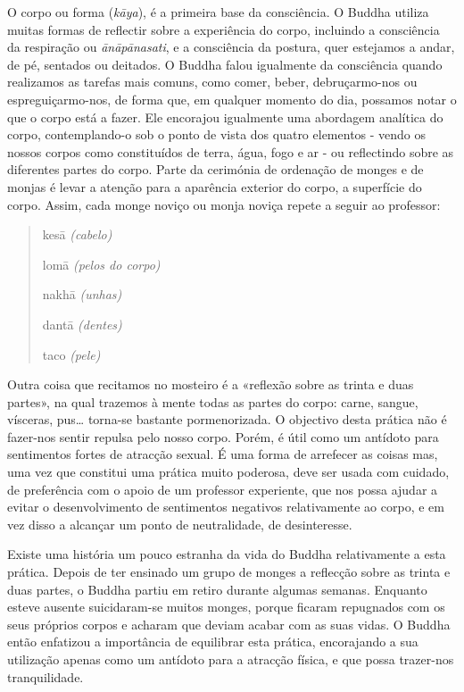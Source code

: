 O corpo ou forma (\emph{kāya}), é a primeira base da consciência. O
Buddha utiliza muitas formas de reflectir sobre a experiência do corpo,
incluindo a consciência da respiração ou \emph{ānāpānasati}, e a
consciência da postura, quer estejamos a andar, de pé, sentados ou
deitados. O Buddha falou igualmente da consciência quando realizamos as
tarefas mais comuns, como comer, beber, debruçarmo-nos ou
espreguiçarmo-nos, de forma que, em qualquer momento do dia, possamos
notar o que o corpo está a fazer. Ele encorajou igualmente uma abordagem
analítica do corpo, contemplando-o sob o ponto de vista dos quatro
elementos - vendo os nossos corpos como constituídos de terra, água,
fogo e ar - ou reflectindo sobre as diferentes partes do corpo. Parte da
cerimónia de ordenação de monges e de monjas é levar a atenção para a
aparência exterior do corpo, a superfície do corpo. Assim, cada monge
noviço ou monja noviça repete a seguir ao professor:

\begin{quote}
  kesā \emph{(cabelo)}

  lomā \emph{(pelos do corpo)}

  nakhā \emph{(unhas)}

  dantā \emph{(dentes)}

  taco \emph{(pele)}
\end{quote}

Outra coisa que recitamos no mosteiro é a «reflexão sobre as trinta e
duas partes», na qual trazemos à mente todas as partes do corpo: carne,
sangue, vísceras, pus\ldots{} torna-se bastante pormenorizada. O
objectivo desta prática não é fazer-nos sentir repulsa pelo nosso corpo.
Porém, é útil como um antídoto para sentimentos fortes de atracção
sexual. É uma forma de arrefecer as coisas mas, uma vez que constitui
uma prática muito poderosa, deve ser usada com cuidado, de preferência
com o apoio de um professor experiente, que nos possa ajudar a evitar o
desenvolvimento de sentimentos negativos relativamente ao corpo, e em
vez disso a alcançar um ponto de neutralidade, de desinteresse.

Existe uma história um pouco estranha da vida do Buddha relativamente a
esta prática. Depois de ter ensinado um grupo de monges a reflecção
sobre as trinta e duas partes, o Buddha partiu em retiro durante algumas
semanas. Enquanto esteve ausente suicidaram-se muitos monges, porque
ficaram repugnados com os seus próprios corpos e acharam que deviam
acabar com as suas vidas. O Buddha então enfatizou a importância de
equilibrar esta prática, encorajando a sua utilização apenas como um
antídoto para a atracção física, e que possa trazer-nos tranquilidade.

